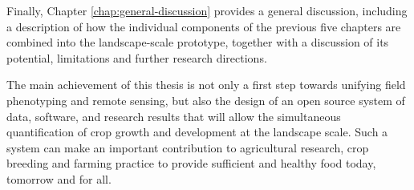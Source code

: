 Finally, Chapter \ref{chap:general-discussion} provides a general discussion, including a description of how the individual components of the previous five chapters are combined into the landscape-scale prototype, together with a discussion of its potential, limitations and further research directions.

The main achievement of this thesis is not only a first step towards unifying field phenotyping and remote sensing, but also the design of an open source system of data, software, and research results that will allow the simultaneous quantification of crop growth and development at the landscape scale. Such a system can make an important contribution to agricultural research, crop breeding and farming practice to provide sufficient and healthy food today, tomorrow and for all.